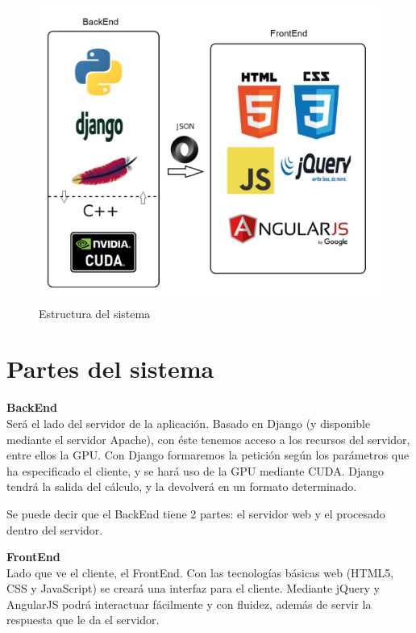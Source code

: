 \bigskip
\begin{figure}[h]
	\centering
	\includegraphics[width=1\linewidth]{../images/estructura}
	\caption[Estructura del sistema]{Estructura del sistema}
	\label{fig:estructura}
\end{figure}



\newpage
\section{Partes del sistema}

\bigskip
\textbf{BackEnd}\\

Será el lado del servidor de la aplicación. Basado en Django (y disponible mediante el servidor Apache), con éste tenemos acceso a los recursos del servidor, entre ellos la GPU. Con Django formaremos la petición según los parámetros que ha especificado el cliente, y se hará uso de la GPU mediante CUDA. Django tendrá la salida del cálculo, y la devolverá en un formato determinado.

Se puede decir que el BackEnd tiene 2 partes: el servidor web y el procesado dentro del servidor.

\bigskip
\textbf{FrontEnd}\\

Lado que ve el cliente, el FrontEnd. Con las tecnologías básicas web (HTML5, CSS y JavaScript) se creará una interfaz para el cliente. Mediante jQuery y AngularJS podrá interactuar fácilmente y con fluidez, además de servir la respuesta que le da el servidor.

